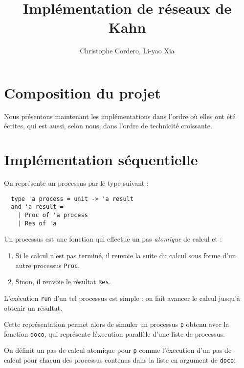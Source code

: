 \documentclass[11pt]{article}
\begin{document}
\title{Impl\'ementation de r\'eseaux de Kahn}

\author{Christophe Cordero, Li-yao Xia}

\maketitle

\section{Composition du projet}

\smallskip

Nous pr\'esentons maintenant les impl\'ementations dans l'ordre
o\`u elles ont \'et\'e \'ecrites, qui est aussi, selon nous, dans l'ordre de technicit\'e croissante.

\section{Impl\'ementation s\'equentielle}

On repr\'esente un processus par le type suivant :

\begin{lstlisting}
  type 'a process = unit -> 'a result
  and 'a result =
    | Proc of 'a process
    | Res of 'a
\end{lstlisting}

Un processus est une fonction qui effectue
un pas {\em atomique} de calcul et :

\begin{enumerate}
  \item Si le calcul n'est pas termin\'e,
    il renvoie la suite du calcul sous forme d'un autre processus {\tt Proc},
  \item Sinon, il renvoie le r\'esultat {\tt Res}.
\end{enumerate}

L'ex\'ecution {\tt run} d'un tel processus est simple :
on fait avancer le calcul jusqu'\`a obtenir un r\'esultat.

\smallskip

Cette repr\'esentation permet alors de simuler un processus {\tt p}
obtenu avec la fonction {\tt doco}, qui repr\'esente l\'execution
parall\`ele d'une liste de processus.

On d\'efinit un pas de calcul atomique pour {\tt p}
comme l'\'execution d'un pas de calcul pour chacun des processus
contenus dans la liste en argument de {\tt doco}.
\end{document}

